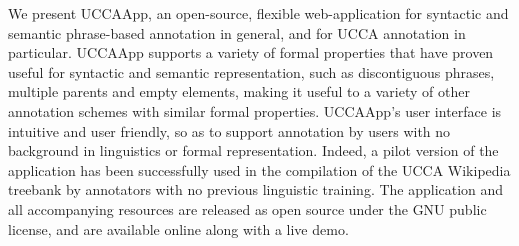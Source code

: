 We present UCCAApp, an open-source, flexible web-application for syntactic and semantic phrase-based annotation in general, and for UCCA annotation in particular. UCCAApp supports a variety of formal properties that have proven useful for syntactic and semantic representation, such as discontiguous phrases, multiple parents and empty elements, making it useful to a variety of other annotation schemes with similar formal properties. UCCAApp's user interface is intuitive and user friendly, so as to support annotation by users with no background in linguistics or formal representation. Indeed, a pilot version of the application has been successfully used in the compilation of the UCCA Wikipedia treebank by annotators with no previous linguistic training. The application and all accompanying resources are released as open source under the GNU public license, and are available online along with a live demo.

